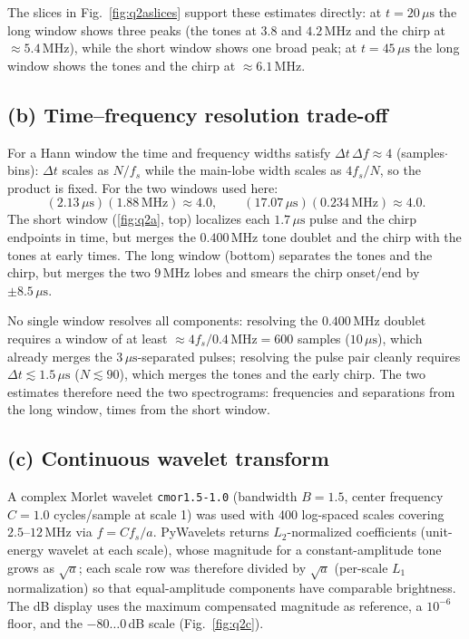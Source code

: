 \documentclass[11pt]{article}
\newcommand{\us}{\ensuremath{\,\mu\mathrm{s}}}
\newcommand{\MHz}{\ensuremath{\,\mathrm{MHz}}}
\begin{document}
The slices in Fig.~\ref{fig:q2aslices} support these estimates directly: at
$t=20\us$ the long window shows three peaks (the tones at $3.8$ and
$4.2\MHz$ and the chirp at $\approx5.4\MHz$), while the short window shows one
broad peak; at $t=45\us$ the long window shows the tones and the chirp at
$\approx6.1\MHz$.

\subsection*{(b) Time--frequency resolution trade-off}

For a Hann window the time and frequency widths satisfy
$\Delta t\,\Delta f\approx4$ (samples$\cdot$bins): $\Delta t$ scales as $N/f_s$
while the main-lobe width scales as $4f_s/N$, so the product is fixed. For the
two windows used here:
\[
(2.13\us)(1.88\MHz)\approx4.0,\qquad
(17.07\us)(0.234\MHz)\approx4.0 .
\]
The short window (\ref{fig:q2a}, top) localizes each $1.7\us$ pulse and the
chirp endpoints in time, but merges the $0.400\MHz$ tone doublet and the
chirp with the tones at early times. The long window (bottom) separates the
tones and the chirp, but merges the two $9\MHz$ lobes and smears the chirp
onset/end by $\pm8.5\us$.

No single window resolves all components: resolving the $0.400\MHz$ doublet
requires a window of at least $\approx4f_s/0.4\MHz=600$ samples
($10\us$), which already merges the $3\us$-separated pulses; resolving the
pulse pair cleanly requires $\Delta t\lesssim1.5\us$ ($N\lesssim90$), which
merges the tones and the early chirp. The two estimates therefore need the two
spectrograms: frequencies and separations from the long window, times from the
short window.

\subsection*{(c) Continuous wavelet transform}

A complex Morlet wavelet \texttt{cmor1.5-1.0} (bandwidth $B=1.5$, center
frequency $C=1.0$ cycles/sample at scale 1) was used with 400 log-spaced
scales covering $2.5$--$12\MHz$ via $f=C f_s/a$. PyWavelets returns
$L_2$-normalized coefficients (unit-energy wavelet at each scale), whose
magnitude for a constant-amplitude tone grows as $\sqrt{a}$; each scale row was
therefore divided by $\sqrt{a}$ (per-scale $L_1$ normalization) so that
equal-amplitude components have comparable brightness. The dB display uses the
maximum compensated magnitude as reference, a $10^{-6}$ floor, and the
$-80\ldots0$\,dB scale (Fig.~\ref{fig:q2c}).
\end{document}
